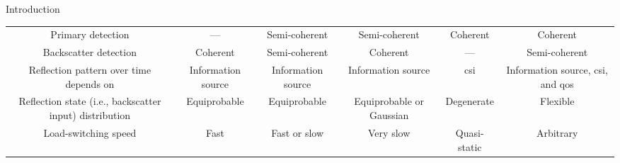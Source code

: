\documentclass[journal]{IEEEtran}
\begin{document}
\begin{section}{Introduction}
\begin{table*}[!t]
\begin{tabularx}{\textwidth}{CCCCCC}
			Primary detection                                       & ---                      & Semi-coherent                           & Semi-coherent                                         & Coherent            & Coherent                                                                \\
			Backscatter detection                                   & Coherent                 & Semi-coherent                           & Coherent                                              & ---                 & Semi-coherent                                                           \\
			Reflection pattern over time depends on                 & Information source       & Information source                      & Information source                                    & \gls{csi}           & Information source, \gls{csi}, and \gls{qos}                            \\
			Reflection state (i.e., backscatter input) distribution & Equiprobable             & Equiprobable                            & Equiprobable or Gaussian                              & Degenerate          & Flexible                                                                \\
			Load-switching speed                                    & Fast                     & Fast or slow                            & Very slow                                             & Quasi-static        & Arbitrary                                                               \\ \bottomrule
		\end{tabularx}
	\end{table*}


\end{section}
\end{document}
